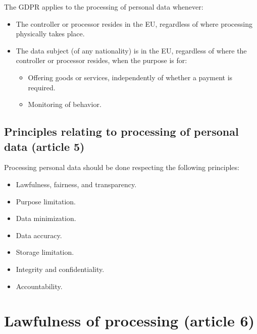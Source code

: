 The GDPR applies to the processing of personal data whenever:
\begin{itemize}
    \item The controller or processor resides in the EU, regardless of where processing physically takes place.
    \item The data subject (of any nationality) is in the EU, regardless of where the controller or processor resides, when the purpose is for:
        \begin{itemize}
            \item Offering goods or services, independently of whether a payment is required.
            \item Monitoring of behavior.
        \end{itemize}
\end{itemize}


\subsection{Principles relating to processing of personal data (article 5)}

Processing personal data should be done respecting the following principles:
\begin{itemize}
    \item Lawfulness, fairness, and transparency.
    \item Purpose limitation.
    \item Data minimization.
    \item Data accuracy.
    \item Storage limitation.
    \item Integrity and confidentiality.
    \item Accountability.
\end{itemize}


\section{Lawfulness of processing (article 6)}

